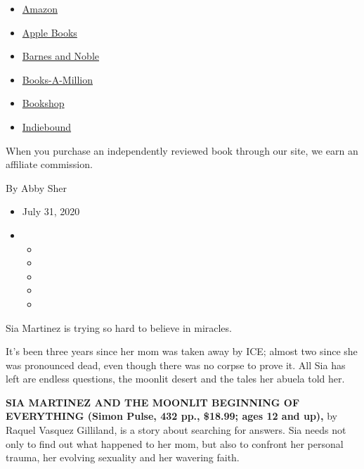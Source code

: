 \begin{itemize}
\tightlist
\item
  \href{https://www.amazon.com/gp/search?index=books\&tag=NYTBSREV-20\&field-keywords=Sia+Martinez+and+the+Moonlit+Beginning+of+Everything+Raquel+Vasquez+Gilliland}{Amazon}
\item
  \href{https://du-gae-books-dot-nyt-du-prd.appspot.com/buy?title=Sia+Martinez+and+the+Moonlit+Beginning+of+Everything\&author=Raquel+Vasquez+Gilliland}{Apple
  Books}
\item
  \href{https://www.anrdoezrs.net/click-7990613-11819508?url=https\%3A\%2F\%2Fwww.barnesandnoble.com\%2Fw\%2F\%3Fean\%3D9781534448650}{Barnes
  and Noble}
\item
  \href{https://www.anrdoezrs.net/click-7990613-35140?url=https\%3A\%2F\%2Fwww.booksamillion.com\%2Fp\%2FSia\%2BMartinez\%2Band\%2Bthe\%2BMoonlit\%2BBeginning\%2Bof\%2BEverything\%2FRaquel\%2BVasquez\%2BGilliland\%2F9781534448650}{Books-A-Million}
\item
  \href{https://bookshop.org/a/3546/9781534448650}{Bookshop}
\item
  \href{https://www.indiebound.org/book/9781534448650?aff=NYT}{Indiebound}
\end{itemize}

When you purchase an independently reviewed book through our site, we
earn an affiliate commission.

By Abby Sher

\begin{itemize}
\item
  July 31, 2020
\item
  \begin{itemize}
  \item
  \item
  \item
  \item
  \item
  \end{itemize}
\end{itemize}

Sia Martinez is trying so hard to believe in miracles.

It's been three years since her mom was taken away by ICE; almost two
since she was pronounced dead, even though there was no corpse to prove
it. All Sia has left are endless questions, the moonlit desert and the
tales her abuela told her.

\textbf{SIA MARTINEZ AND THE MOONLIT BEGINNING OF EVERYTHING (Simon
Pulse, 432 pp., \$18.99; ages 12 and up),} by Raquel Vasquez Gilliland,
is a story about searching for answers. Sia needs not only to find out
what happened to her mom, but also to confront her personal trauma, her
evolving sexuality and her wavering faith.

